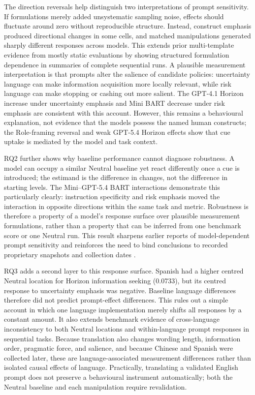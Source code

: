 \documentclass[logo,msc,inf]{infthesis}       %
\begin{document}
The direction reversals help distinguish two interpretations of prompt sensitivity. If formulations merely added unsystematic sampling noise, effects should fluctuate around zero without reproducible structure. Instead, construct emphasis produced directional changes in some cells, and matched manipulations generated sharply different responses across models. This extends prior multi-template evidence from mostly static evaluations \cite{Sclar2024PromptFormatting,Mizrahi2024MultiPrompt} by showing structured formulation dependence in summaries of complete sequential runs. A plausible measurement interpretation is that prompts alter the salience of candidate policies: uncertainty language can make information acquisition more locally relevant, while risk language can make stopping or cashing out more salient. The GPT-4.1 Horizon increase under uncertainty emphasis and Mini BART decrease under risk emphasis are consistent with this account. However, this remains a behavioural explanation, not evidence that the models possess the named human constructs; the Role-framing reversal and weak GPT-5.4 Horizon effects show that cue uptake is mediated by the model and task context.

RQ2 further shows why baseline performance cannot diagnose robustness. A model can occupy a similar Neutral baseline yet react differently once a cue is introduced; the estimand is the difference in changes, not the difference in starting levels. The Mini--GPT-5.4 BART interactions demonstrate this particularly clearly: instruction specificity and risk emphasis moved the interaction in opposite directions within the same task and metric. Robustness is therefore a property of a model's response surface over plausible measurement formulations, rather than a property that can be inferred from one benchmark score or one Neutral run. This result sharpens earlier reports of model-dependent prompt sensitivity \cite{Zhuo2024ProSA} and reinforces the need to bind conclusions to recorded proprietary snapshots and collection dates \cite{Chen2024ChatGPTBehavior,Palmer2024ProprietaryModels}.

RQ3 adds a second layer to this response surface. Spanish had a higher centred Neutral location for Horizon information seeking (0.0733), but its centred response to uncertainty emphasis was negative. Baseline language differences therefore did not predict prompt-effect differences. This rules out a simple account in which one language implementation merely shifts all responses by a constant amount. It also extends benchmark evidence of cross-language inconsistency \cite{Qi2023CrossLingualConsistency} to both Neutral locations and within-language prompt responses in sequential tasks. Because translation also changes wording length, information order, pragmatic force, and salience, and because Chinese and Spanish were collected later, these are language-associated measurement differences rather than isolated causal effects of language. Practically, translating a validated English prompt does not preserve a behavioural instrument automatically; both the Neutral baseline and each manipulation require revalidation.
\end{document}
